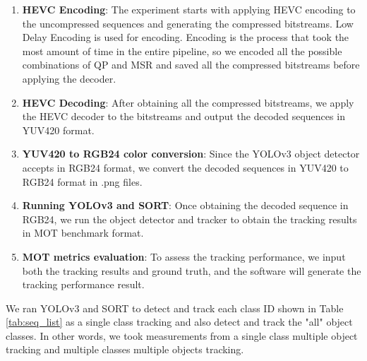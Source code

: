 \begin{enumerate}
    \item \textbf{HEVC Encoding}: The experiment starts with applying HEVC encoding to the uncompressed sequences and generating the compressed bitstreams. Low Delay Encoding is used for encoding. Encoding is the process that took the most amount of time in the entire pipeline, so we encoded all the possible combinations of QP and MSR and saved all the compressed bitstreams before applying the decoder.
    \item \textbf{HEVC Decoding}: After obtaining all the compressed bitstreams, we apply the HEVC decoder to the bitstreams and output the decoded sequences in YUV420 format.
    \item \textbf{YUV420 to RGB24 color conversion}: Since the YOLOv3 object detector accepts in RGB24 format, we convert the decoded sequences in YUV420 to RGB24 format in .png files.
    \item \textbf{Running YOLOv3 and SORT}: Once obtaining the decoded sequence in RGB24, we run the object detector and tracker to obtain the tracking results in MOT benchmark format. 
    \item \textbf{MOT metrics evaluation}: To assess the tracking performance, we input both the tracking results and ground truth, and the software \cite{heindl_cheindpy-motmetrics_2021} will generate the tracking performance result.
\end{enumerate}
We ran YOLOv3 and SORT to detect and track each class ID shown in Table \ref{tab:seq_list} as a single class tracking and also detect and track the "all" object classes. In other words, we took measurements from a single class multiple object tracking and multiple classes multiple objects tracking.

